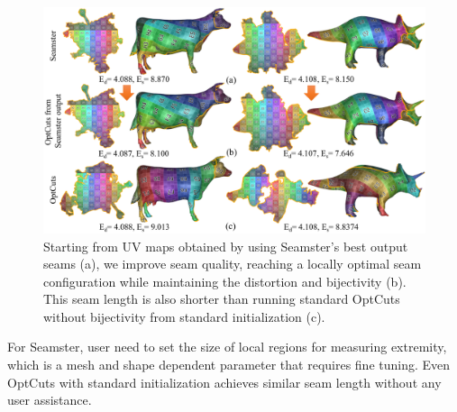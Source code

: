 \begin{figure}[!h]
\centering
\includegraphics[width=\linewidth]{fig/comp_Seamster.png}
\caption{Starting from UV maps obtained by using Seamster's best output seams (a), we improve seam quality, reaching a locally optimal seam configuration while maintaining the distortion and bijectivity (b). This seam length is also shorter than running standard OptCuts without bijectivity from standard initialization (c).}
\label{fig:comp_Seamster}
\end{figure}

For Seamster, user need to set the size of local regions for measuring extremity, which is a mesh and shape dependent parameter that requires fine tuning. Even OptCuts with standard initialization achieves similar seam length without any user assistance.
